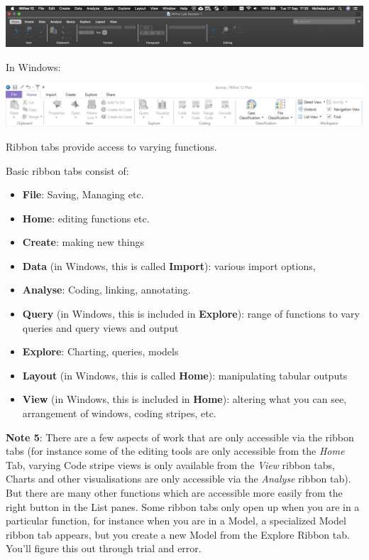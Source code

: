 \documentclass[
]{book}
\providecommand{\tightlist}{%
  \setlength{\itemsep}{0pt}\setlength{\parskip}{0pt}}
\begin{document}
\includegraphics{imgs/ribbon_mac.png}

In Windows:

\includegraphics{imgs/ribbon_pc.png}

Ribbon tabs provide access to varying functions.

Basic ribbon tabs consist of:

\begin{itemize}
\tightlist
\item
  \textbf{File}: Saving, Managing etc.
\item
  \textbf{Home}: editing functions etc.
\item
  \textbf{Create}: making new things
\item
  \textbf{Data} (in Windows, this is called \textbf{Import}): various import options,
\item
  \textbf{Analyse}: Coding, linking, annotating.
\item
  \textbf{Query} (in Windows, this is included in \textbf{Explore}): range of functions to vary queries and query views and output
\item
  \textbf{Explore}: Charting, queries, models
\item
  \textbf{Layout} (in Windows, this is called \textbf{Home}): manipulating tabular outputs
\item
  \textbf{View} (in Windows, this is included in \textbf{Home}): altering what you can see, arrangement of windows, coding stripes, etc.
\end{itemize}

\textbf{Note 5}: There are a few aspects of work that are only accessible via the ribbon tabs (for instance some of the editing tools are only accessible from the \emph{Home} Tab, varying Code stripe views is only available from the \emph{View} ribbon tabs, Charts and other visualisations are only accessible via the \emph{Analyse} ribbon tab). But there are many other functions which are accessible more easily from the right button in the List panes. Some ribbon tabs only open up when you are in a particular function, for instance when you are in a Model, a specialized Model ribbon tab appears, but you create a new Model from the Explore Ribbon tab. You'll figure this out through trial and error.
\end{document}
